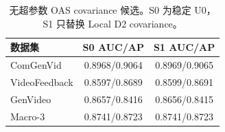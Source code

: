 \begin{table}[!t]
  \centering
  \caption{无超参数 OAS covariance 候选。S0 为稳定 U0，S1 只替换 Local D2 covariance。}
  \label{tab:u0_oas_candidate}
  \begin{tabular}{lcc}
    \toprule
    数据集 & S0 AUC/AP & S1 AUC/AP \\
    \midrule
    ComGenVid & 0.8968/0.9064 & 0.8969/0.9065 \\
    VideoFeedback & 0.8597/0.8689 & 0.8599/0.8691 \\
    GenVideo & 0.8657/0.8416 & 0.8656/0.8415 \\
    Macro-3 & 0.8741/0.8723 & 0.8741/0.8723 \\
    \bottomrule
  \end{tabular}
\end{table}
